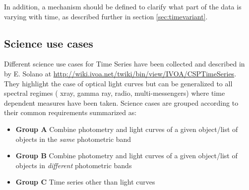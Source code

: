\documentclass[11pt,a4paper]{ivoa}
\begin{document}
In addition, a mechanism should be defined to clarify what part of the data is varying with time, as described further in section \ref{sec:timevariant}.

\subsection{Science use cases}
\label{sect:usecases}
Different science use cases for Time Series have been collected and described in by E. Solano  at \url{http://wiki.ivoa.net/twiki/bin/view/IVOA/CSPTimeSeries}.
They highlight the case of optical light curves but can be generalized to all spectral regimes ( xray, gamma ray, radio, multi-messengers)  where time dependent measures have been taken.
Science cases are grouped according to their common requirements summarized as:
\begin{itemize}
\item \textbf{Group A} Combine photometry and light curves of a given object/list of objects in the \emph{same} photometric band
\item \textbf{Group B} Combine photometry and light curves of a given object/list of objects in \emph{different} photometric bands
\item \textbf{Group C} Time series other than light curves
\end{itemize}

%
\end{document}
